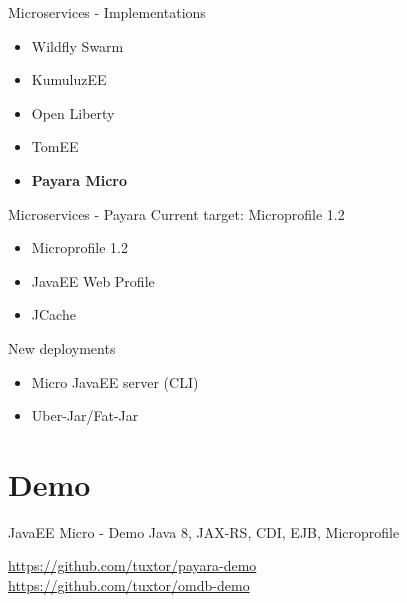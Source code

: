 \documentclass{beamer}
\begin{document}
\begin{frame}{Microservices - Implementations}
\begin{itemize}
	\item Wildfly Swarm
	\item KumuluzEE
	\item Open Liberty
	\item TomEE
	\item \textbf{Payara Micro}
\end{itemize}
\end{frame}

\begin{frame}{Microservices - Payara}
Current target: Microprofile 1.2 

\begin{itemize}
	\item Microprofile 1.2 
	\item JavaEE Web Profile
	\item JCache
\end{itemize}

New deployments
\begin{itemize}
	\item Micro JavaEE server (CLI)
	\item Uber-Jar/Fat-Jar
\end{itemize}
\end{frame}



\section{Demo}
\begin{frame}{JavaEE Micro  - Demo}
\huge Java 8, JAX-RS, CDI, EJB, Microprofile

\normalsize  \url{https://github.com/tuxtor/payara-demo}\\
\normalsize  \url{https://github.com/tuxtor/omdb-demo}
\end{frame}
\end{document}
